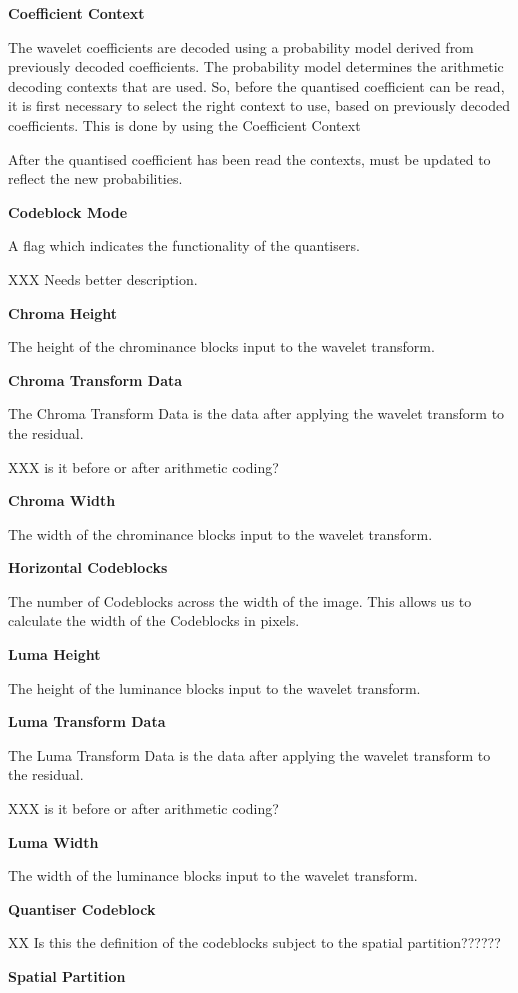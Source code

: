 
\textbf{Coefficient Context}

The wavelet coefficients are decoded using a probability model derived
from previously decoded coefficients. The probability model determines
the arithmetic decoding contexts that are used. So, before the quantised
coefficient can be read, it is first necessary to select the right
context to use, based on previously decoded coefficients. This is done
by using the Coefficient Context

After the quantised coefficient has been read the contexts, must be
updated to reflect the new probabilities.

\textbf{Codeblock Mode}

A flag which indicates the functionality of the quantisers.

XXX Needs better description.

\textbf{Chroma Height}

The height of the chrominance blocks input to the wavelet transform.

\textbf{Chroma Transform Data}

The Chroma Transform Data is the data after applying the wavelet
transform to the residual.

XXX is it before or after arithmetic coding?

\textbf{Chroma Width}

The width of the chrominance blocks input to the wavelet transform.

\textbf{Horizontal Codeblocks}

The number of Codeblocks across the width of the image. This allows us
to calculate the width of the Codeblocks in pixels.

\textbf{Luma Height}

The height of the luminance blocks input to the wavelet transform.

\textbf{Luma Transform Data}

The Luma Transform Data is the data after applying the wavelet transform
to the residual.

XXX is it before or after arithmetic coding?

\textbf{Luma Width}

The width of the luminance blocks input to the wavelet transform.

\textbf{Quantiser Codeblock}

XX Is this the definition of the codeblocks subject to the spatial
partition??????

\textbf{Spatial Partition}

